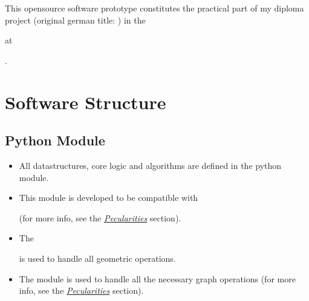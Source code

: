 \documentclass[letterpaper,10pt,english]{sphinxmanual}
\begin{document}
This open\sphinxhyphen{}source software prototype constitutes the practical part of my
diploma project  (original german title: ) in the %
\begin{footnote}[9]\sphinxAtStartFootnote
{}
%
\end{footnote} at
%
\begin{footnote}[20]\sphinxAtStartFootnote
{}
%
\end{footnote}.


\section{Software Structure}
\label{\detokenize{README:software-structure}}

\subsection{Python Module}
\label{\detokenize{README:python-module}}\begin{itemize}
\item {} 
All datastructures, core logic and algorithms are defined in the
 python module.

\item {} 
This module is developed to be compatible with
%
\begin{footnote}[21]\sphinxAtStartFootnote
{}
%
\end{footnote} (for more info, see the
{\hyperref[\detokenize{README:pecularities}]{\emph{Pecularities}}} section).

\item {} 
The %
\begin{footnote}[22]\sphinxAtStartFootnote
{}
%
\end{footnote}
is used to handle all geometric operations.

\item {} 
The  module is used to handle all the necessary graph
operations (for more info, see the {\hyperref[\detokenize{README:pecularities}]{\emph{Pecularities}}}
section).

\end{itemize}
\end{document}
